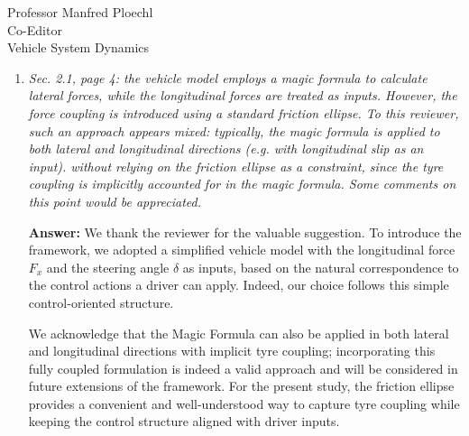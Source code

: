 \documentclass{letter}
\begin{document}
\begin{letter}{Professor Manfred Ploechl\\
Co-Editor\\
Vehicle System Dynamics}
\begin{enumerate}
In further works we are actually planning to adopt more complex models and to parallelize the problem solution on multiple cores. This approach has been explored by our research group in these previous works:

\begin{itemize}
  \item https://doi.org/10.1007/s11044-023-09932-6
  \item https://doi.org/10.1080/00423114.2024.2407175,
\end{itemize}
 
where the nominal minimum lap-time problem was solved for a 14-DoF multibody model.

Finally, since the reviewer has pointed out this specific feature, we would like to remark that, although the out-of-plane dynamics is neglected in our model, we took at least into account the (steady-state) longitudinal load transfers.

\hrulefill

\item
\textit{Sec. 2.1, page 4: the vehicle model employs a magic formula to calculate lateral forces, while the longitudinal forces are treated as inputs. However, the force coupling is introduced using a standard friction ellipse. To this reviewer, such an approach appears mixed: typically, the magic formula is applied to both lateral and longitudinal directions (e.g. with longitudinal slip as an input). without relying on the friction ellipse as a constraint, since the tyre coupling is implicitly accounted for in the magic formula. Some comments on this point would be appreciated.}

\vspace{2mm}

\textbf{Answer:}
We thank the reviewer for the valuable suggestion.
To introduce the framework, we adopted a simplified vehicle model with the longitudinal force $F_x$ and the steering angle $\delta$ as inputs, based on the natural correspondence to the control actions a driver can apply. Indeed, our choice follows this simple control-oriented structure.

We acknowledge that the Magic Formula can also be applied in both lateral and longitudinal directions with implicit tyre coupling; incorporating this fully coupled formulation is indeed a valid approach and will be considered in future extensions of the framework. For the present study, the friction ellipse provides a convenient and well-understood way to capture tyre coupling while keeping the control structure aligned with driver inputs.



\end{enumerate}
\end{letter}
\end{document}
